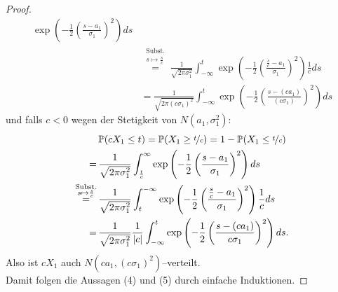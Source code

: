 \begin{proof}
\begin{align*}
\exp\left(- \frac 1 2 \left(\frac{s-a_1}{\sigma_1}\right)^2 \right)ds\\
&\overset{\substack{\text{Subst.}\\s \mapsto \frac s c}}=
\frac 1{\sqrt{2\pi\sigma_1^2}}\int_{-\infty}^t 
\exp\left(-\frac 1 2 \left(\frac{\frac s c - a_1}{\sigma_1} \right)^2
 \right)\frac 1 c ds\\
 &=\frac 1 {\sqrt{2 \pi (c\sigma_1)^2}}\int_{-\infty}^t 
 \exp\left(-\frac 12\left(\frac{s-(ca_1)}{(c\sigma_1)}\right)^2 \right)ds
\end{align*}
und falls $c < 0$ wegen der Stetigkeit von $N(a_1, \sigma_1^2)$:
\begin{align*}
&\,\mathbb{P}(cX_1 \le t) = \mathbb{P}(X_1 \ge \nicefrac tc) 
= 1 - \mathbb{P}(X_1 \le \nicefrac t c)\\
=&\,
\frac 1 {\sqrt{2\pi\sigma_1^2}}\int_{\frac t c}^\infty
\exp\left(- \frac 1 2 \left(\frac{s-a_1}{\sigma_1}\right)^2 \right)ds\\
\overset{\substack{\text{Subst.}\\s \mapsto \frac s c}}=&\,
\frac 1 {\sqrt{2\pi\sigma_1^2}}\int_{ t }^{-\infty}
\exp\left(-\frac 12\left(\frac{\frac sc-a_1}{\sigma_1}\right)^2\right)
\frac 1 c ds\\
=&\, \frac 1{\sqrt{2\pi\sigma_1^2}}\frac 1{\left|c\right|}
\int_{-\infty}^t \exp\left(-\frac 12\left(\frac{ s-(ca_1)}{c\sigma_1}\right)^2\right)ds\text.
\end{align*}
Also ist $cX_1$ auch $N(ca_1, (c\sigma_1)^2)$--verteilt.\\
Damit folgen die Aussagen (4) und (5) durch einfache Induktionen.
\end{proof}